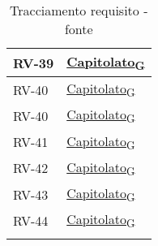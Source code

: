 \begin{longtable}{|>{\centering\arraybackslash}m{}|>{\centering\arraybackslash}m{}|}
	RV-39              & \href{https://7last.github.io/docs/rtb/documentazione-interna/glossario\#capitolato}{Capitolato\textsubscript{G}}                                                                                                                                    \\\hline
	RV-40              & \href{https://7last.github.io/docs/rtb/documentazione-interna/glossario\#capitolato}{Capitolato\textsubscript{G}}                                                                                                                                    \\\hline
	RV-40              & \href{https://7last.github.io/docs/rtb/documentazione-interna/glossario\#capitolato}{Capitolato\textsubscript{G}}                                                                                                                                    \\\hline
	RV-41              & \href{https://7last.github.io/docs/rtb/documentazione-interna/glossario\#capitolato}{Capitolato\textsubscript{G}}                                                                                                                                    \\\hline
	RV-42              & \href{https://7last.github.io/docs/rtb/documentazione-interna/glossario\#capitolato}{Capitolato\textsubscript{G}}                                                                                                                                    \\\hline
	RV-43              & \href{https://7last.github.io/docs/rtb/documentazione-interna/glossario\#capitolato}{Capitolato\textsubscript{G}}                                                                                                                                    \\\hline
	RV-44              & \href{https://7last.github.io/docs/rtb/documentazione-interna/glossario\#capitolato}{Capitolato\textsubscript{G}}                                                                                                                                    \\\hline
	\caption{Tracciamento requisito - fonte}
	\label{table:4}
\end{longtable}

